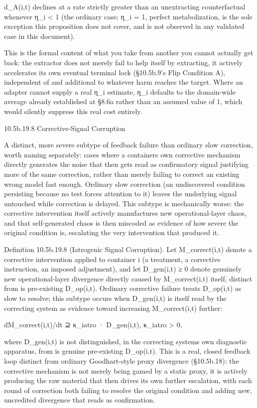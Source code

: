 \documentclass[
]{article}
\begin{document}
d\_A(i,t) declines at a rate strictly greater than an unextracting
counterfactual whenever η\_i \textless{} 1 (the ordinary case; η\_i = 1,
perfect metabolization, is the sole exception this proposition does not
cover, and is not observed in any validated case in this document).

This is the formal content of what you take from another you cannot
actually get back: the extractor does not merely fail to help itself by
extracting, it actively accelerates its own eventual terminal lock
(§10.5b.9's Flip Condition A), independent of and additional to whatever
harm reaches the target. Where an adapter cannot supply a real η\_i
estimate, η\_i defaults to the domain-wide average already established
at §8.6a rather than an assumed value of 1, which would silently
suppress this real cost entirely.

10.5b.19.8 Corrective-Signal Corruption

A distinct, more severe subtype of feedback failure than ordinary slow
correction, worth naming separately: cases where a containers own
corrective mechanism directly generates the noise that then gets read as
confirmatory signal justifying more of the same correction, rather than
merely failing to correct an existing wrong model fast enough. Ordinary
slow correction (an undiscovered condition persisting because no test
forces attention to it) leaves the underlying signal untouched while
correction is delayed. This subtype is mechanically worse: the
corrective intervention itself actively manufactures new
operational-layer chaos, and that self-generated chaos is then miscoded
as evidence of how severe the original condition is, escalating the very
intervention that produced it.

Definition 10.5b.19.8 (Iatrogenic Signal Corruption). Let
M\_correct(i,t) denote a corrective intervention applied to container i
(a treatment, a corrective instruction, an imposed adjustment), and let
D\_gen(i,t) ≥ 0 denote genuinely new operational-layer divergence
directly caused by M\_correct(i,t) itself, distinct from is pre-existing
D\_op(i,t). Ordinary corrective failure treats D\_op(i,t) as slow to
resolve; this subtype occurs when D\_gen(i,t) is itself read by the
correcting system as evidence toward increasing M\_correct(i,t) further:

dM\_correct(i,t)/dt ⊇ κ\_iatro · D\_gen(i,t), κ\_iatro \textgreater{} 0,

where D\_gen(i,t) is not distinguished, in the correcting systems own
diagnostic apparatus, from is genuine pre-existing D\_op(i,t). This is a
real, closed feedback loop distinct from ordinary Goodhart-style proxy
divergence (§10.5b.18): the corrective mechanism is not merely being
gamed by a static proxy, it is actively producing the raw material that
then drives its own further escalation, with each round of correction
both failing to resolve the original condition and adding new,
uncredited divergence that reads as confirmation.
\end{document}

